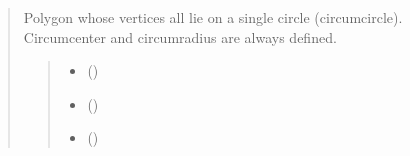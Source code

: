 \documentclass[letterpaper,10pt,english]{sphinxmanual}
\begin{document}
\begin{quote}
\begin{fulllineitems}
\sphinxAtStartPar
Polygon whose vertices all lie on a single circle (circumcircle).
Circumcenter and circumradius are always defined.
\begin{quote}\begin{description}
\begin{itemize}
\item {} 
\sphinxAtStartPar
{} ()

\item {} 
\sphinxAtStartPar
{} (\sphinxstyleliteralemphasis{\sphinxupquote{ | }})

\item {} 
\sphinxAtStartPar
{} (\sphinxstyleliteralemphasis{\sphinxupquote{ | }})

\end{itemize}

\end{description}\end{quote}

\begin{fulllineitems}
\label{\detokenize{pygeox:pygeox.custom_objects.CyclicPolygon.circumcenter}}
\pysigstartsignatures
\pysigline
{}
\pysigstopsignatures
\end{fulllineitems}


\begin{fulllineitems}
\label{\detokenize{pygeox:pygeox.custom_objects.CyclicPolygon.circumradius}}
\pysigstartsignatures
\pysigline
{}
\pysigstopsignatures
\end{fulllineitems}


\end{fulllineitems}


\end{quote}
\end{document}
